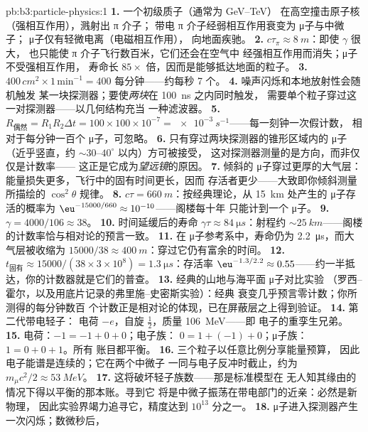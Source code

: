 \begin{solution}{pb:b3:particle-physics:1}
\textbf{1.} 一个初级质子（通常为 \unit{GeV}--\unit{TeV}）
在高空撞击原子核（强相互作用），溅射出 π 介子；
带电 π 介子经弱相互作用衰变为 μ子与中微子；
μ子仅有轻微电离（电磁相互作用），
向地面疾驰。
\textbf{2.} $c\tau_\pi \approx \qty{8}{m}$：即使 $\gamma$ 很大，
也只能使 π 介子飞行数百米，它们还会在空气中
经强相互作用而消失；μ子不受强相互作用，
寿命长 $85\times$ 倍，因而是能够抵达地面的粒子。
\textbf{3.} $400\,\unit{cm^2}\times1\,\text{min}^{-1} = 400$
每分钟——约每秒 7 个。
\textbf{4.} 噪声闪烁和本地放射性会随机触发
某一块探测器；要使\emph{两块}在 \qty{100}{ns} 之内同时触发，
需要单个粒子穿过这一对探测器——以几何结构充当
一种滤波器。
\textbf{5.} $R_{\text{偶然}} = R_1R_2\Delta t = 100\times100
\times10^{-7} = \qty{e-3}{s^{-1}}$——每一刻钟一次假计数，
相对于每分钟一百个 μ子，可忽略。
\textbf{6.} 只有穿过两块探测器的锥形区域内的
μ子（近乎竖直，约 ${\sim}30$--$40^\circ$ 以内）方可被接受，
这对探测器测量的是方向，而非仅仅是计数率——
这正是它成为\emph{望远镜}的原因。
\textbf{7.} 倾斜的 μ子穿过更厚的大气层：
能量损失更多，飞行中的固有时间更长，因而
存活者更少——大致即你倾斜测量所描绘的 $\cos^2\theta$ 规律。
\textbf{8.} $c\tau = \qty{660}{m}$：按经典理论，从
\qty{15}{km} 处产生的 μ子存活的概率为
$\eu^{-15000/660} \approx 10^{-10}$——阁楼每十年
只能计到一个 μ子。
\textbf{9.} $\gamma = 4000/106 \approx 38$。
\textbf{10.} 时间延缓后的寿命 $\gamma\tau \approx
\qty{84}{\micro s}$：射程约 ${\sim}\qty{25}{km}$——阁楼
的计数率恰与相对论的预言一致。
\textbf{11.} 在 μ子参考系中，寿命仍为
\qty{2.2}{\micro s}，而大气层被收缩为
$15000/38 \approx \qty{400}{m}$：穿过它仍有富余的时间。
\textbf{12.} $t_{\text{固有}} \approx 15000/(38\times3\times
10^8) = \qty{1.3}{\micro s}$：存活率 $\eu^{-1.3/2.2} \approx
0.55$——约一半抵达，你的计数器就是它们的普查。
\textbf{13.} 经典的山地与海平面 μ子对比实验
（罗西–霍尔，以及用底片记录的弗里施–史密斯实验）：经典
衰变几乎预言零计数；你所测得的每分钟数百
个计数正是相对论的体现，已在屏蔽层之上得到验证。
\textbf{14.} 第二代带电轻子：
电荷 $-e$，自旋 $\tfrac12$，质量 \qty{106}{MeV}——即
电子的重孪生兄弟。
\textbf{15.} 电荷：$-1 = -1 + 0 + 0$；电子族：
$0 = 1 + (-1) + 0$；μ子族：$1 = 0 + 0 + 1$。所有
账目都平衡。
\textbf{16.} 三个粒子以任意比例分享能量预算，
因此电子能谱是连续的；它在两个中微子
一同与电子反冲时截止，约为
$m_\mu c^2/2 \approx \qty{53}{MeV}$。
\textbf{17.} 这将破坏轻子族数——那是标准模型在
无人知其缘由的情况下得以平衡的那本账。寻到它
将是中微子振荡在带电部门的近亲：必然是新物理，
因此实验界竭力追寻它，精度达到
$10^{13}$ 分之一。
\textbf{18.} μ子进入探测器产生一次闪烁；数微秒后，

\end{solution}
